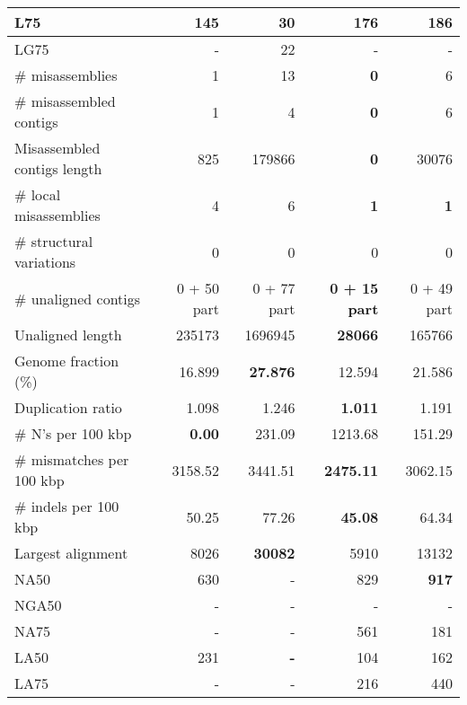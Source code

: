 \documentclass[12pt,a4paper]{article}
\begin{document}
\begin{table}[ht]
\begin{center}
\begin{tabular}{|l*{4}{|r}|}
L75 & 145 & {\bf 30} & 176 & 186 \\ \hline
LG75 & - & 22 & - & - \\ \hline
\# misassemblies & 1 & 13 & {\bf 0} & 6 \\ \hline
\# misassembled contigs & 1 & 4 & {\bf 0} & 6 \\ \hline
Misassembled contigs length & 825 & 179866 & {\bf 0} & 30076 \\ \hline
\# local misassemblies & 4 & 6 & {\bf 1} & {\bf 1} \\ \hline
\# structural variations & 0 & 0 & 0 & 0 \\ \hline
\# unaligned contigs & 0 + 50 part & 0 + 77 part & {\bf 0 + 15 part} & 0 + 49 part \\ \hline
Unaligned length & 235173 & 1696945 & {\bf 28066} & 165766 \\ \hline
Genome fraction (\%) & 16.899 & {\bf 27.876} & 12.594 & 21.586 \\ \hline
Duplication ratio & 1.098 & 1.246 & {\bf 1.011} & 1.191 \\ \hline
\# N's per 100 kbp & {\bf 0.00} & 231.09 & 1213.68 & 151.29 \\ \hline
\# mismatches per 100 kbp & 3158.52 & 3441.51 & {\bf 2475.11} & 3062.15 \\ \hline
\# indels per 100 kbp & 50.25 & 77.26 & {\bf 45.08} & 64.34 \\ \hline
Largest alignment & 8026 & {\bf 30082} & 5910 & 13132 \\ \hline
NA50 & 630 & - & 829 & {\bf 917} \\ \hline
NGA50 & - & - & - & - \\ \hline
NA75 & - & - & 561 & 181 \\ \hline
LA50 & 231 & {\bf -} & 104 & 162 \\ \hline
LA75 & - & - & 216 & 440 \\ \hline
\end{tabular}
\end{center}
\end{table}
\end{document}
